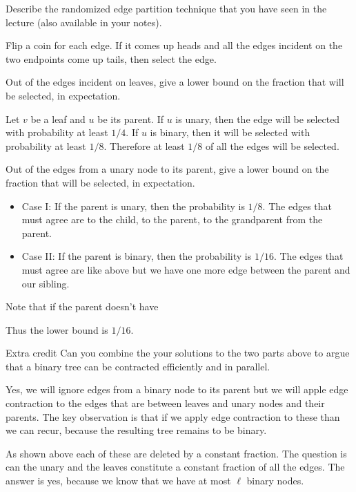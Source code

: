 \begin{problem}
\ask[2.]
Describe the randomized edge partition technique that you have seen in
the lecture (also available in your notes). 

\sol
Flip a coin for each edge. If it comes up heads and all the edges
incident on the two endpoints come up tails, then select the edge.


\ask[5.]
Out of the edges incident on leaves, give a lower bound on the
fraction that will be selected, in expectation.

\sol
Let $v$ be a leaf and $u$ be its parent. If $u$ is unary, then the
edge will be selected with probability at least $1/4$.  If $u$ is
binary, then it will be selected with probability at least $1/8$.
Therefore at least $1/8$ of all the edges will be selected.




\ask[5.]
Out of the edges from a unary node to its parent, give a lower bound
on the fraction that will be selected, in expectation.

\sol
\begin{itemize}
\item Case I: If the parent is unary, then the probability is $1/8$.
The edges that must agree are to the child, to the parent, to the
grandparent from the parent.
\item Case II: If the parent is binary, then the probability is
$1/16$. The edges that must agree are like above but we have one more
edge between the parent and our sibling.
\end{itemize}

Note that if the parent doesn't have 

Thus the lower bound is $1/16$.


\end{problem}

\begin{problem}[4.]{Extra credit}
\ask
Can you combine the your solutions to the two parts above to argue
that a binary tree can be contracted efficiently and in parallel.

\sol
Yes, we will ignore edges from a binary node to its parent but we will
apple edge contraction to the edges that are between leaves and unary
nodes and their parents.  The key observation is that if we apply edge
contraction to these than we can recur, because the resulting
tree remains to be binary.

As shown above each of these are deleted by a constant fraction.  The
question is can the unary and the leaves constitute a constant
fraction of all the edges.  The answer is yes, because we know that we
have at most $\ell$ binary nodes.  
\end{problem}

